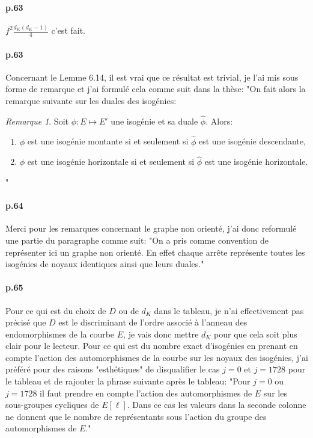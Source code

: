 \documentclass[10pt,a4paper]{article}
\theoremstyle{plain}
\theoremstyle{definition}
\theoremstyle{definition}
\theoremstyle{definition}
\theoremstyle{definition}
\theoremstyle{definition}
\theoremstyle{remark}
\newtheorem{rem}[thm]{Remarque}
\theoremstyle{remark}
\theoremstyle{definition}
\begin{document}
\paragraph{p.63}{$f^2\frac{d_K (d_K-1)}{4}$ c'est fait.}

\paragraph{p.63}{Concernant le Lemme 6.14, il est vrai que ce résultat est trivial, je l'ai mis sous forme de remarque et j'ai formulé cela comme suit dans la thèse: 
"On fait alors la remarque suivante sur les duales des isogénies:
\begin{rem}
\label{lem:dua:vol}
Soit $\phi : E \mapsto E'$ une isogénie et sa duale $\widehat{\phi}$. Alors:
\begin{enumerate}
\item $\phi$ est une isogénie montante si et seulement si $\widehat{\phi}$ est une isogénie descendante,
\item $\phi$ est une isogénie horizontale si et seulement si $\widehat{\phi}$ est une isogénie horizontale.
\end{enumerate}
\end{rem}"}

\paragraph{p.64}{Merci pour les remarques concernant le graphe non orienté, 
j'ai donc reformulé une partie du paragraphe comme suit: "On a pris comme 
convention de représenter ici un graphe non orienté. En effet chaque arrête 
représente toutes les isogénies de noyaux identiques ainsi que leurs duales."}

\paragraph{p.65}{Pour ce qui est du choix de $D$ ou de $d_{K}$ dans le tableau,
je n'ai effectivement pas précisé que $D$ est le discriminant de l'ordre 
associé à l'anneau des endomorphismes de la courbe $E$, je vais donc mettre 
$d_K$ pour que cela soit plus clair pour le lecteur. Pour ce qui est du nombre 
exact d'isogénies en prenant en compte l'action des automorphismes de la 
courbe sur les noyaux des isogénies, j'ai préféré pour des raisons 
"esthétiques" de disqualifier le cas $j=0$ et $j=1728$ pour le tableau et de 
rajouter la phrase suivante après le tableau: "Pour $j=0$ ou $j=1728$ il faut 
prendre en compte l'action des automorphismes de
$E$ sur les sous-groupes cycliques de $E[\ell]$. Dans ce cas
 les valeurs dans la seconde colonne ne donnent que le nombre 
de représentants sous l'action du groupe des automorphismes de $E$."}
\end{document}
